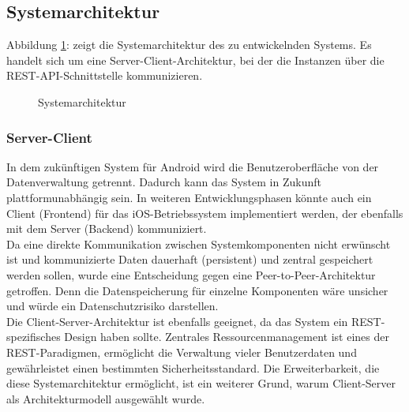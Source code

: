 \subsection{Systemarchitektur}
Abbildung \ref{img:Systemarchitektur}:  zeigt die Systemarchitektur des zu entwickelnden Systems. Es handelt sich um eine Server-Client-Architektur, bei der die Instanzen über die REST-API-Schnittstelle kommunizieren.
\begin{figure}[H]
	\centering
	\setlength{\fboxsep}{1pt}
	\setlength{\fboxrule}{1pt}
	\captionsetup{justification=centering}
	\caption{Systemarchitektur}
	\label{img:Systemarchitektur}
\end{figure}
\subsubsection{Server-Client}
	In dem zukünftigen System für Android wird die Benutzeroberfläche von der Datenverwaltung getrennt. Dadurch kann das System in Zukunft plattformunabhängig sein. In weiteren Entwicklungsphasen könnte auch ein Client (Frontend) für das iOS-Betriebssystem implementiert werden, der ebenfalls mit dem Server (Backend) kommuniziert.\\
	Da eine direkte Kommunikation zwischen Systemkomponenten nicht erwünscht ist und kommunizierte Daten dauerhaft (persistent) und zentral gespeichert werden sollen, wurde eine Entscheidung gegen eine Peer-to-Peer-Architektur getroffen. Denn die Datenspeicherung für einzelne Komponenten wäre unsicher und würde ein Datenschutzrisiko darstellen.\\
	Die Client-Server-Architektur ist ebenfalls geeignet, da das System ein REST-spezifisches Design haben sollte. Zentrales Ressourcenmanagement ist eines der REST-Paradigmen, ermöglicht die Verwaltung vieler Benutzerdaten und gewährleistet einen bestimmten Sicherheitsstandard. Die Erweiterbarkeit, die diese Systemarchitektur ermöglicht, ist ein weiterer Grund, warum Client-Server als Architekturmodell ausgewählt wurde. 
